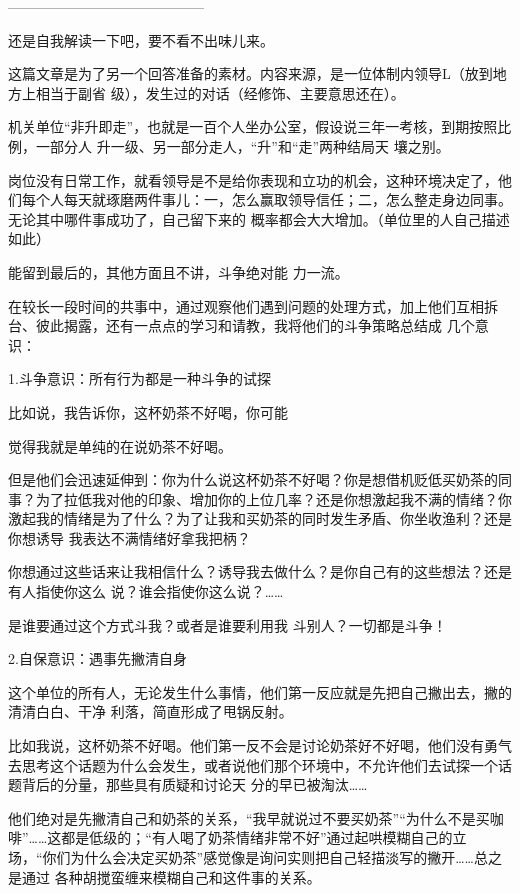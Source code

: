 \documentclass{article}
\begin{document}
—————————————— 


还是自我解读一下吧，要不看不出味儿来。 

这篇文章是为了另一个回答准备的素材。内容来源，是一位体制内领导L（放到地方上相当于副省
级），发生过的对话（经修饰、主要意思还在）。 

机关单位“非升即走”，也就是一百个人坐办公室，假设说三年一考核，到期按照比例，一部分人
\newpage
升一级、另一部分走人，“升”和“走”两种结局天
壤之别。 

岗位没有日常工作，就看领导是不是给你表现和立功的机会，这种环境决定了，他们每个人每天就琢磨两件事儿：一，怎么赢取领导信任；二，怎么整走身边同事。无论其中哪件事成功了，自己留下来的
概率都会大大增加。（单位里的人自己描述如此） 

能留到最后的，其他方面且不讲，斗争绝对能
力一流。 

在较长一段时间的共事中，通过观察他们遇到问题的处理方式，加上他们互相拆台、彼此揭露，还有一点点的学习和请教，我将他们的斗争策略总结成
几个意识： 

1.斗争意识：所有行为都是一种斗争的试探

比如说，我告诉你，这杯奶茶不好喝，你可能

\newpage
觉得我就是单纯的在说奶茶不好喝。 

但是他们会迅速延伸到：你为什么说这杯奶茶不好喝？你是想借机贬低买奶茶的同事？为了拉低我对他的印象、增加你的上位几率？还是你想激起我不满的情绪？你激起我的情绪是为了什么？为了让我和买奶茶的同时发生矛盾、你坐收渔利？还是你想诱导
我表达不满情绪好拿我把柄？ 

你想通过这些话来让我相信什么？诱导我去做什么？是你自己有的这些想法？还是有人指使你这么
说？谁会指使你这么说？…… 

是谁要通过这个方式斗我？或者是谁要利用我
斗别人？一切都是斗争！ 


2.自保意识：遇事先撇清自身 

这个单位的所有人，无论发生什么事情，他们第一反应就是先把自己撇出去，撇的清清白白、干净
利落，简直形成了甩锅反射。 

\newpage

比如我说，这杯奶茶不好喝。他们第一反不会是讨论奶茶好不好喝，他们没有勇气去思考这个话题为什么会发生，或者说他们那个环境中，不允许他们去试探一个话题背后的分量，那些具有质疑和讨论天
分的早已被淘汰…… 

他们绝对是先撇清自己和奶茶的关系，“我早就说过不要买奶茶”“为什么不是买咖啡”……这都是低级的；“有人喝了奶茶情绪非常不好”通过起哄模糊自己的立场，“你们为什么会决定买奶茶”感觉像是询问实则把自己轻描淡写的撇开……总之是通过
各种胡搅蛮缠来模糊自己和这件事的关系。 
\end{document}
